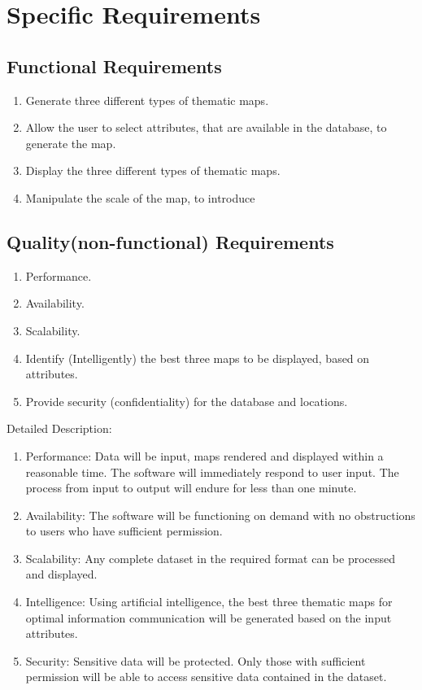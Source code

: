 \documentclass{article}
\begin{document}
	\section{Specific Requirements}
    	\subsection{Functional Requirements}
        \begin{enumerate}[label=\alph*]
        \item Generate three different types of thematic maps.
		\item Allow the user to select attributes, that are available in the database, to generate the map.
		\item Display the three different types of thematic maps.
		\item Manipulate the scale of the map, to introduce
        \end{enumerate}
        \subsection{Quality(non-functional) Requirements}
        \begin{enumerate}[label=\alph*]
        \item Performance.
		\item Availability.
		\item Scalability.
		\item Identify (Intelligently) the best three maps to be displayed, based on attributes.
        \item Provide security (confidentiality) for the database and locations.\\
        \end{enumerate}
        Detailed Description:
        \begin{enumerate}[label=\alph*]
        \item Performance: Data will be input, maps rendered and displayed within a reasonable time. The software will immediately respond to user input. The process from input to output will endure for less than one minute. 
		\item Availability: The software will be functioning on demand with no obstructions to users who have sufficient permission.
		\item Scalability: Any complete dataset in the required format can be processed and displayed.
		\item Intelligence: Using artificial intelligence, the best three thematic maps for optimal information communication will be generated based on the input attributes.
        \item Security: Sensitive data will be protected. Only those with sufficient permission will be able to access sensitive data contained in the dataset.
        \end{enumerate}
        
\end{document}
